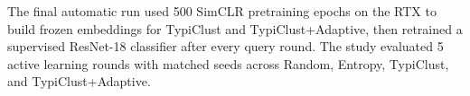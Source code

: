 The final automatic run used 500 SimCLR pretraining epochs on the RTX to build frozen embeddings for TypiClust and TypiClust+Adaptive, then retrained a supervised ResNet-18 classifier after every query round. The study evaluated 5 active learning rounds with matched seeds across Random, Entropy, TypiClust, and TypiClust+Adaptive.
